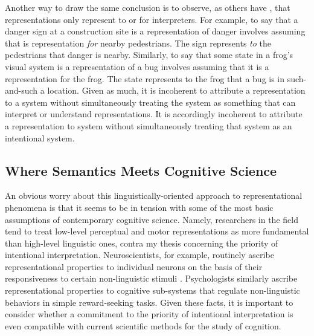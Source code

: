 Another way to draw the same conclusion is to observe, as others have \citep[e.g.,][]{Brandom:1994}, that representations only represent to or for interpreters. For example, to say that a danger sign at a construction site is a representation of danger involves assuming that is representation \textit{for} nearby pedestrians. The sign represents \textit{to} the pedestrians that danger is nearby. Similarly, to say that some state in a frog's visual system is a representation of a bug involves assuming that it is a representation for the frog. The state represents to the frog that a bug is in such-and-such a location. Given as much, it is incoherent to attribute a representation to a system without simultaneously treating the system as something that can interpret or understand representations. It is accordingly incoherent to attribute a representation to system without simultaneously treating that system as an intentional system.

\subsection{Where Semantics Meets Cognitive Science}

An obvious worry about this linguistically-oriented approach to representational phenomena is that it seems to be in tension with some of the most basic assumptions of contemporary cognitive science. Namely, researchers in the field tend to treat low-level perceptual and motor representations as more fundamental than high-level linguistic ones, contra my thesis concerning the priority of intentional interpretation. Neuroscientists, for example, routinely ascribe representational properties to individual neurons on the basis of their responsiveness to certain non-linguistic stimuli \citep{Eliasmith:2000,EliasmithAnderson:2003,Eliasmith:2013}. Psychologists similarly ascribe representational properties to cognitive sub-systems that regulate non-linguistic behaviors in simple reward-seeking tasks. Given these facts, it is important to consider whether a commitment to the priority of intentional interpretation is even compatible with current scientific methods for the study of cognition. 

